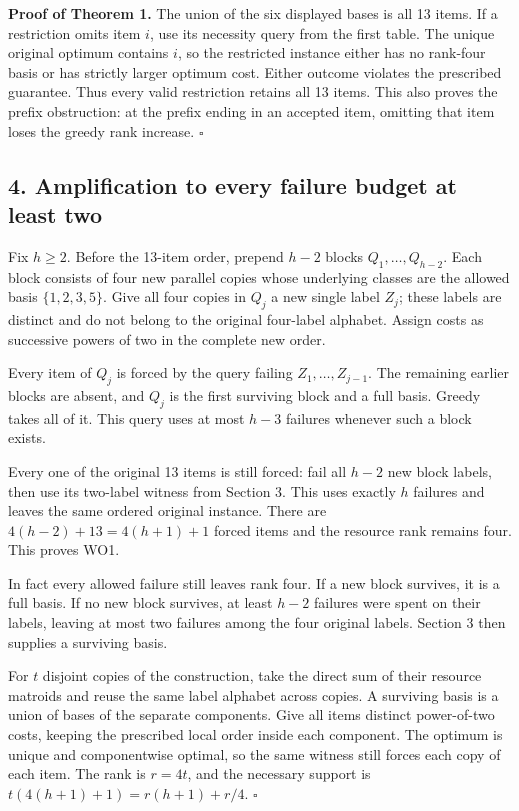 \textbf{Proof of Theorem 1.} The union of the six displayed bases is all 13 items. If a restriction omits item \(i\), use its necessity query from the first table. The unique original optimum contains \(i\), so the restricted instance either has no rank-four basis or has strictly larger optimum cost. Either outcome violates the prescribed guarantee. Thus every valid restriction retains all 13 items. This also proves the prefix obstruction: at the prefix ending in an accepted item, omitting that item loses the greedy rank increase. \(\square\)

\hypertarget{af-f44144c751-amplification-to-every-failure-budget-at-least-two}{%
\subsection{4. Amplification to every failure budget at least two}\label{af-f44144c751-amplification-to-every-failure-budget-at-least-two}}

Fix \(h\ge2\). Before the 13-item order, prepend \(h-2\) blocks \(Q_1,\ldots,Q_{h-2}\). Each block consists of four new parallel copies whose underlying classes are the allowed basis \(\{1,2,3,5\}\). Give all four copies in \(Q_j\) a new single label \(Z_j\); these labels are distinct and do not belong to the original four-label alphabet. Assign costs as successive powers of two in the complete new order.

Every item of \(Q_j\) is forced by the query failing \(Z_1,\ldots,Z_{j-1}\). The remaining earlier blocks are absent, and \(Q_j\) is the first surviving block and a full basis. Greedy takes all of it. This query uses at most \(h-3\) failures whenever such a block exists.

Every one of the original 13 items is still forced: fail all \(h-2\) new block labels, then use its two-label witness from Section 3. This uses exactly \(h\) failures and leaves the same ordered original instance. There are \(4(h-2)+13=4(h+1)+1\) forced items and the resource rank remains four. This proves WO1.

In fact every allowed failure still leaves rank four. If a new block survives, it is a full basis. If no new block survives, at least \(h-2\) failures were spent on their labels, leaving at most two failures among the four original labels. Section 3 then supplies a surviving basis.

For \(t\) disjoint copies of the construction, take the direct sum of their resource matroids and reuse the same label alphabet across copies. A surviving basis is a union of bases of the separate components. Give all items distinct power-of-two costs, keeping the prescribed local order inside each component. The optimum is unique and componentwise optimal, so the same witness still forces each copy of each item. The rank is \(r=4t\), and the necessary support is \(t(4(h+1)+1)=r(h+1)+r/4\). \(\square\)

